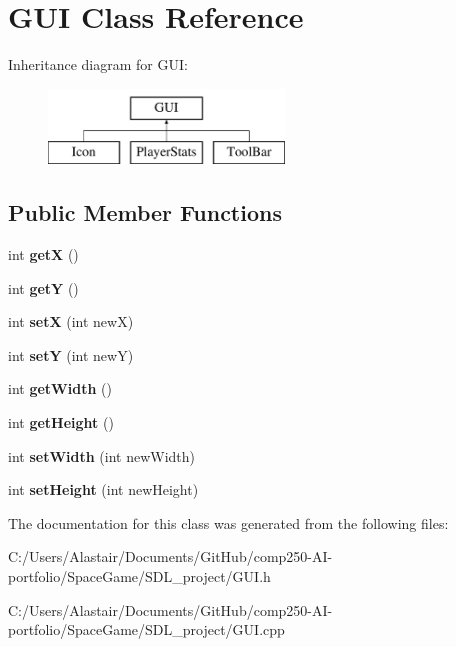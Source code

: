\hypertarget{class_g_u_i}{}\section{G\+UI Class Reference}
\label{class_g_u_i}
Inheritance diagram for G\+UI\+:\begin{figure}[H]
\begin{center}
\leavevmode
\includegraphics[height=2.000000cm]{class_g_u_i}
\end{center}
\end{figure}
\subsection*{Public Member Functions}
\begin{DoxyCompactItemize}
\item 
\mbox{\label{class_g_u_i_a84f72298745c32d42cff88122f064b87}} 
int {\bfseries getX} ()
\item 
\mbox{\label{class_g_u_i_a6092c145d73a1ba90b363413994ed1c2}} 
int {\bfseries getY} ()
\item 
\mbox{\label{class_g_u_i_a1ea78c6d2cd7527949c86d6364e0ba58}} 
int {\bfseries setX} (int newX)
\item 
\mbox{\label{class_g_u_i_a6a8fd57ede00d6ce473a5ca62dbe8c7c}} 
int {\bfseries setY} (int newY)
\item 
\mbox{\label{class_g_u_i_adf5b1e95c3b7993ffc260819d3b65a86}} 
int {\bfseries get\+Width} ()
\item 
\mbox{\label{class_g_u_i_a840bc57fdf153af9c3e6cd963de1c0d2}} 
int {\bfseries get\+Height} ()
\item 
\mbox{\label{class_g_u_i_aded24bcc960ca3ff7679cf0deda9c2ec}} 
int {\bfseries set\+Width} (int new\+Width)
\item 
\mbox{\label{class_g_u_i_a909f92c2f9553b8ff2b994b6559108d0}} 
int {\bfseries set\+Height} (int new\+Height)
\end{DoxyCompactItemize}


The documentation for this class was generated from the following files\+:\begin{DoxyCompactItemize}
\item 
C\+:/\+Users/\+Alastair/\+Documents/\+Git\+Hub/comp250-\/\+A\+I-\/portfolio/\+Space\+Game/\+S\+D\+L\+\_\+project/G\+U\+I.\+h\item 
C\+:/\+Users/\+Alastair/\+Documents/\+Git\+Hub/comp250-\/\+A\+I-\/portfolio/\+Space\+Game/\+S\+D\+L\+\_\+project/G\+U\+I.\+cpp\end{DoxyCompactItemize}

